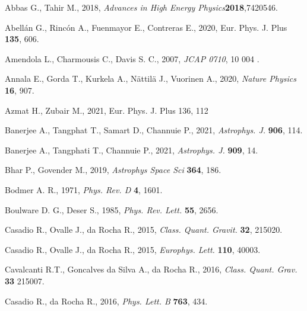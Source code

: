 \documentclass[]{aastex631}
\begin{document}
\begin{thebibliography}{99}

  Abbas G.,  Tahir M.,  2018, {\em Advances in High Energy Physics}{\bf 2018},7420546.

  Abell\'an G.,  Rinc\'on A., Fuenmayor E.,  Contreras E., 2020, Eur. Phys. J. Plus \textbf{135}, 606.

 Amendola L., Charmousis C., Davis S. C., 2007,  {\em JCAP 0710}, {  10} 004 .

  Annala E.,  Gorda T.,  Kurkela A.,  Nättilä J.,  Vuorinen A.,  2020, {\em  Nature Physics} {\bf 16}, 907. 

  Azmat H.,  Zubair M., 2021, Eur. Phys. J. Plus 136, 112

  Banerjee A.,  Tangphat T.,  Samart D.,  Channuie P.,  2021, {\em Astrophys. J.} {\bf 906}, 114. 

  Banerjee A.,  Tangphati T.,  Channuie P.,  2021, {\em Astrophys. J.} {\bf 909}, 14.

  Bhar P.,  Govender M.,  2019, {\em  Astrophys Space Sci} {\bf  364}, 186.

  Bodmer A. R.,  1971, {\em  Phys. Rev. D} {\bf 4}, 1601.

  Boulware D. G.,  Deser S.,  1985, {\em Phys. Rev. Lett.} {\bf 55},  2656.

  Casadio R.,  Ovalle J.,  da Rocha R.,  2015, {\em Class. Quant. Gravit.} {\bf  32}, 215020. 

  Casadio R.,  Ovalle J.,  da Rocha R.,  2015, {\em Europhys. Lett.} {\bf 110}, 40003. 

  Cavalcanti R.T.,  Goncalves da Silva A.,  da Rocha R.,  2016, {\em Class. Quant. Grav.} {\bf  33} 215007.

  Casadio R.,  da Rocha R., 2016, {\em Phys. Lett. B} {\bf 763}, 434.


\end{thebibliography}
\end{document}
